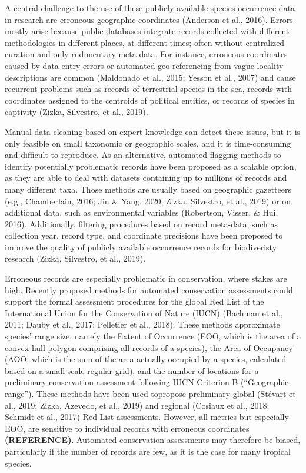 \documentclass[
  12pt,
]{article}
\begin{document}
A central challenge to the use of these publicly available species occurrence data in research are erroneous geographic coordinates (Anderson et al., 2016). Errors mostly arise because public databases integrate records collected with different methodologies in different places, at different times; often without centralized curation and only rudimentary meta-data. For instance, erroneous coordinates caused by data-entry errors or automated geo-referencing from vague locality descriptions are common (Maldonado et al., 2015; Yesson et al., 2007) and cause recurrent problems such as records of terrestrial species in the sea, records with coordinates assigned to the centroids of political entities, or records of species in captivity (Zizka, Silvestro, et al., 2019).

Manual data cleaning based on expert knowledge can detect these issues, but it is only feasible on small taxonomic or geographic scales, and it is time-consuming and difficult to reproduce. As an alternative, automated flagging methods to identify potentially problematic records have been proposed as a scalable option, as they are able to deal with datasets containing up to millions of records and many different taxa. Those methods are usually based on geographic gazetteers (e.g., Chamberlain, 2016; Jin \& Yang, 2020; Zizka, Silvestro, et al., 2019) or on additional data, such as environmental variables (Robertson, Visser, \& Hui, 2016). Additionally, filtering procedures based on record meta-data, such as collection year, record type, and coordinate precisions have been proposed to improve the quality of publicly available occurrence records for biodiveristy research (Zizka, Silvestro, et al., 2019).

Erroneous records are especially problematic in conservation, where stakes are high. Recently proposed methods for automated conservation assessments could support the formal assessment procedures for the global Red List of the International Union for the Conservation of Nature (IUCN) (Bachman et al., 2011; Dauby et al., 2017; Pelletier et al., 2018). These methods approximate species' range size, namely the Extent of Occurrence (EOO, which is the area of a convex hull polygon comprising all records of a species), the Area of Occupancy (AOO, which is the sum of the area actually occupied by a species, calculated based on a small-scale regular grid), and the number of locations for a preliminary conservation assessment following IUCN Criterion B (``Geographic range''). These methods have been used topropose preliminary global (Stévart et al., 2019; Zizka, Azevedo, et al., 2019) and regional (Cosiaux et al., 2018; Schmidt et al., 2017) Red List assessments. However, all metrics but especially EOO, are sensitive to individual records with erroneous coordinates \textbf{(REFERENCE)}. Automated conservation assessments may therefore be biased, particularly if the number of records are few, as it is the case for many tropical species.
\end{document}
